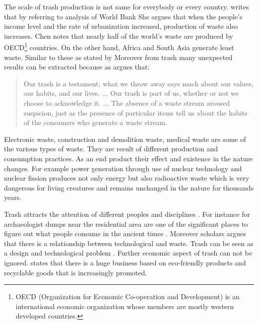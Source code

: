 The scale of trash production is not same for everybody or every country. \citet[2]{chen2015waste} writes that by referring to analysis of World Bank  She argues that when the people’s income level and the rate of urbanization increased, production of waste also increases. Chen notes that nearly half of the world’s waste are produced by OECD\footnote{OECD (Organization for Economic Co-operation and Development) is an international economic organization whose members are mostly western developed countries.} countries. On the other hand, Africa and South Asia generate least waste. Similar to these as stated by \citet[16]{cerny1996recycled}  Moreover from trash many unexpected results can be extracted because as \citet[xxv]{zimring2012encyclopedia} argues that:

\begin{quote}
Our trash is a testament; what we throw away says much about our values, our habits, and our lives. ... Our trash is part of us, whether or not we choose to acknowledge it. ... The absence of a waste stream aroused suspicion, just as the presence of particular items tell us about the habits of the consumers who generate a waste stream.
\end{quote}

Electronic waste, construction and demolition waste, medical waste are some of the various types of waste. They are result of different production and consumption practices. As an end product their effect and existence in the nature changes. For example power generation through use of nuclear technology and nuclear fission produces not only energy but also radioactive waste which is very dangerous for living creatures and remains unchanged in the nature for thousands years.

Trash attracts the attention of different peoples and disciplines  \citep[63]{emgin2012trashion}. For instance for archaeologist dumps near the residential area are one of the significant places to figure out what people consume in the ancient times \citep{rathje1992rubbish}. Moreover scholars argues that there is a relationship between technological and waste. Trash can be seen as a design and technological problem \citep{mcdonough2010cradle}. Further economic aspect of trash can not be ignored. \citet[65]{emgin2012trashion} states that there is a huge business based on eco-friendly products and recyclable goods that is increasingly promoted.


